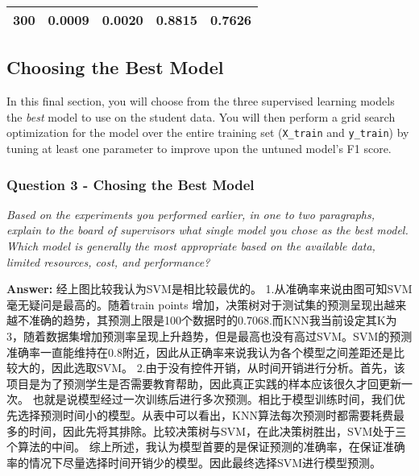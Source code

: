 \documentclass{ctexart}
\begin{document}
\begin{longtable}[]{@{}ccccc@{}}
\begin{minipage}[t]{0.16\columnwidth}\centering\strut
300\strut
\end{minipage} & \begin{minipage}[t]{0.21\columnwidth}\centering\strut
0.0009\strut
\end{minipage} & \begin{minipage}[t]{0.20\columnwidth}\centering\strut
0.0020\strut
\end{minipage} & \begin{minipage}[t]{0.15\columnwidth}\centering\strut
0.8815\strut
\end{minipage} & \begin{minipage}[t]{0.14\columnwidth}\centering\strut
0.7626\strut
\end{minipage}\tabularnewline
\bottomrule
\end{longtable}

    \subsection{Choosing the Best Model}\label{choosing-the-best-model}

In this final section, you will choose from the three supervised
learning models the \emph{best} model to use on the student data. You
will then perform a grid search optimization for the model over the
entire training set (\texttt{X\_train} and \texttt{y\_train}) by tuning
at least one parameter to improve upon the untuned model's F1 score.

    \subsubsection{Question 3 - Chosing the Best
Model}\label{question-3---chosing-the-best-model}

\emph{Based on the experiments you performed earlier, in one to two
paragraphs, explain to the board of supervisors what single model you
chose as the best model. Which model is generally the most appropriate
based on the available data, limited resources, cost, and performance?}

    \textbf{Answer: } 经上图比较我认为SVM是相比较最优的。
1.从准确率来说由图可知SVM毫无疑问是最高的。随着train points
增加，决策树对于测试集的预测呈现出越来越不准确的趋势，其预测上限是100个数据时的0.7068.而KNN我当前设定其K为3，随着数据集增加预测率呈现上升趋势，但是最高也没有高过SVM。SVM的预测准确率一直能维持在0.8附近，因此从正确率来说我认为各个模型之间差距还是比较大的，因此选取SVM。
2.由于没有控件开销，从时间开销进行分析。首先，该项目是为了预测学生是否需要教育帮助，因此真正实践的样本应该很久才回更新一次。
也就是说模型经过一次训练后进行多次预测。相比于模型训练时间，我们优先选择预测时间小的模型。从表中可以看出，KNN算法每次预测时都需要耗费最多的时间，因此先将其排除。比较决策树与SVM，在此决策树胜出，SVM处于三个算法的中间。
综上所述，我认为模型首要的是保证预测的准确率，在保证准确率的情况下尽量选择时间开销少的模型。因此最终选择SVM进行模型预测。
\end{document}
